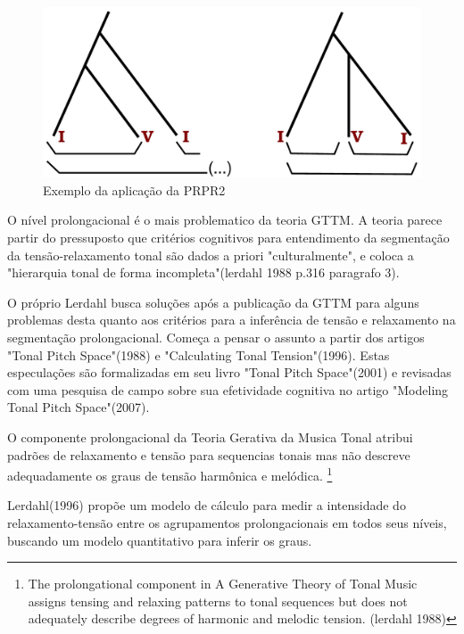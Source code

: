 \documentclass[
	12pt,				%
	openright,			%
	twoside,			%
	a4paper,			%
	english,			%
	french,				%
	spanish,			%
	brazil				%
	]{abntex2}
\begin{document}
\begin{figure}[!h]
	\caption{\label{fig_grafico}Exemplo da aplicação da PRPR2}
	\begin{center}
	    \includegraphics[scale=0.35]{gttm/prolongacional.pdf}
	\end{center}
\end{figure}



O nível prolongacional é o mais problematico da teoria GTTM. A teoria parece partir do pressuposto que critérios cognitivos para entendimento da segmentação da tensão-relaxamento tonal são dados a priori "culturalmente", e coloca a "hierarquia tonal de forma incompleta"(lerdahl 1988 p.316 paragrafo 3).

O próprio Lerdahl busca soluções após a publicação da GTTM para alguns problemas desta quanto aos critérios para a inferência de tensão e relaxamento na segmentação prolongacional. Começa a pensar o assunto a partir dos artigos "Tonal Pitch Space"(1988) e "Calculating Tonal Tension"(1996). Estas especulações são formalizadas em seu livro "Tonal Pitch Space"(2001) e revisadas com uma pesquisa de campo sobre sua efetividade cognitiva no artigo "Modeling Tonal Pitch Space"(2007).

O componente prolongacional da Teoria Gerativa da Musica Tonal
atribui padrões de relaxamento e tensão para sequencias tonais mas
não descreve adequadamente os graus de tensão harmônica e melódica.
\footnote{
The prolongational component in A Generative Theory of Tonal Music
assigns tensing and relaxing patterns to tonal sequences but does not
adequately describe degrees of harmonic and melodic tension. (lerdahl 1988)
}


Lerdahl(1996) propõe um modelo de cálculo para medir a intensidade do relaxamento-tensão entre os agrupamentos prolongacionais em todos seus níveis, buscando um modelo quantitativo para inferir os graus.
\end{document}
